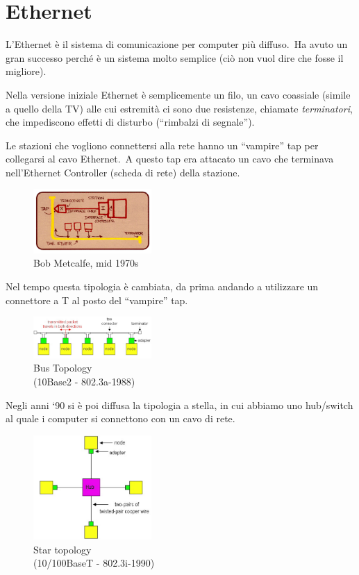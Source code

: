 \chapter{Ethernet}

L'Ethernet è il sistema di comunicazione per computer più diffuso.\
Ha avuto un gran successo perché è un sistema molto semplice (ciò non vuol dire che fosse il migliore).\

Nella versione iniziale Ethernet è semplicemente un filo, un cavo coassiale (simile a quello della TV) alle cui estremità ci sono due resistenze, chiamate \textit{terminatori}, che impediscono effetti di disturbo (``rimbalzi di segnale'').

Le stazioni che vogliono connettersi alla rete hanno un ``vampire'' tap per collegarsi al cavo Ethernet.\
A questo tap era attacato un cavo che terminava nell'Ethernet Controller (scheda di rete) della stazione.

\begin{figure}[H]
    \centering
    \includegraphics[width=0.4\textwidth]{immagini/Ethernet.png}
    \caption*{Bob Metcalfe, mid 1970s}
\end{figure}

\noindent Nel tempo questa tipologia è cambiata, da prima andando a utilizzare un connettore a T al posto del ``vampire'' tap.

\begin{figure}[H]
    \centering
    \includegraphics[width=0.4\textwidth]{immagini/Ethernet_bus.png}
    \caption*{Bus Topology\\(10Base2 - 802.3a-1988)}
\end{figure}
\noindent Negli anni `90 si è poi diffusa la tipologia a stella, in cui abbiamo uno hub/switch al quale i computer si connettono con un cavo di rete.

\begin{figure}[H]
    \centering
    \includegraphics[width=0.4\textwidth]{immagini/Ethernet_hub.png}
    \caption*{Star topology\\ (10/100BaseT - 802.3i-1990)}
\end{figure}

